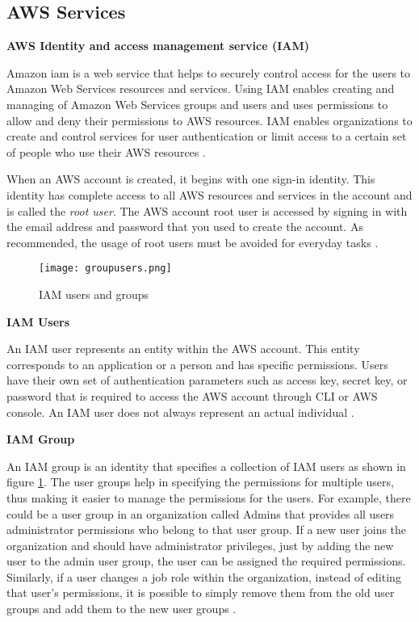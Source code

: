 \subsection{AWS Services}

\textbf{AWS Identity and access management service (IAM)}

\par Amazon \gls{iam} is a web service that helps to
securely
control access for the users to Amazon Web Services resources and services.
Using IAM enables creating and managing of Amazon Web
Services groups and users and uses permissions to allow and deny their permissions to AWS resources.
IAM enables organizations to create and control services
for user authentication or limit access to a certain set of people who use their AWS resources \cite{24}.


\par When an AWS account is created, it begins with one
sign-in identity.
This identity has
complete access to all AWS resources and services in the account and is called the \textit{root user}.
The AWS account root
user is accessed by signing in with the email address and password that you used to create the account.
As
recommended, the usage of root users must be avoided for
everyday tasks \cite{25}.


\begin{figure}
    \centering
    \texttt{[image: groupusers.png]}
    \caption{IAM users and groups}{\cite{26}}
    \label{fig:groupusers}
\end{figure}

\textbf{IAM Users}

\par An IAM user represents an entity within the AWS account.
This entity corresponds to an application or a person and has specific permissions.
Users have their own set of authentication parameters such as access key, secret key, or password that is required to access the AWS account through CLI or AWS console.
An IAM user does not always represent an actual
individual \cite{27}.
\hfill \break

\textbf{IAM Group}
\par An IAM group is an identity that specifies a 
collection of IAM users as shown in figure \ref{fig:groupusers}.
The user
groups help in specifying the permissions for multiple users, thus making it easier to manage the permissions for the users.
For example, there could be a user group in an organization called Admins that provides all users administrator permissions who belong to that user group.
If a new user joins the organization and should have administrator privileges, just by adding the new user to the admin user group, the user can be assigned the required permissions.
Similarly, if a user changes a job role within the organization, instead of editing that user’s permissions, it is possible to simply remove them from the old user groups and add them to the new user groups \cite{27}.
\hfill \break

